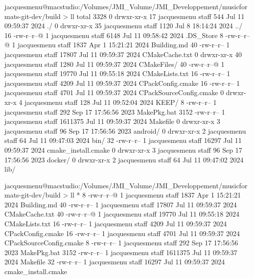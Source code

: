 jacquesmenu@macstudio:/Volumes/JMI_Volume/JMI_Developpement/musicformats-git-dev/build > ll
total 3328
   0 drwxr-xr-x  17 jacquesmenu  staff      544 Jul 11 09:59:37 2024 ./
   0 drwxr-xr-x  35 jacquesmenu  staff     1120 Jul  8 18:14:24 2024 ../
  16 -rw-r--r--@  1 jacquesmenu  staff     6148 Jul 11 09:58:42 2024 .DS_Store
   8 -rw-r--r--@  1 jacquesmenu  staff     1837 Apr  1 15:21:21 2024 Building.md
  40 -rw-r--r--   1 jacquesmenu  staff    17807 Jul 11 09:59:37 2024 CMakeCache.txt
   0 drwxr-xr-x  40 jacquesmenu  staff     1280 Jul 11 09:59:37 2024 CMakeFiles/
  40 -rw-r--r--@  1 jacquesmenu  staff    19770 Jul 11 09:55:18 2024 CMakeLists.txt
  16 -rw-r--r--   1 jacquesmenu  staff     4209 Jul 11 09:59:37 2024 CPackConfig.cmake
  16 -rw-r--r--   1 jacquesmenu  staff     4701 Jul 11 09:59:37 2024 CPackSourceConfig.cmake
   0 drwxr-xr-x   4 jacquesmenu  staff      128 Jul 11 09:52:04 2024 KEEP/
   8 -rw-r--r--   1 jacquesmenu  staff      292 Sep 17 17:56:56 2023 MakePkg.bat
3152 -rw-r--r--   1 jacquesmenu  staff  1611375 Jul 11 09:59:37 2024 Makefile
   0 drwxr-xr-x   3 jacquesmenu  staff       96 Sep 17 17:56:56 2023 android/
   0 drwxr-xr-x   2 jacquesmenu  staff       64 Jul 11 09:47:03 2024 bin/
  32 -rw-r--r--   1 jacquesmenu  staff    16297 Jul 11 09:59:37 2024 cmake_install.cmake
   0 drwxr-xr-x   3 jacquesmenu  staff       96 Sep 17 17:56:56 2023 docker/
   0 drwxr-xr-x   2 jacquesmenu  staff       64 Jul 11 09:47:02 2024 lib/






jacquesmenu@macstudio:/Volumes/JMI_Volume/JMI_Developpement/musicformats-git-dev/build > ll *
   8 -rw-r--r--@ 1 jacquesmenu  staff     1837 Apr  1 15:21:21 2024 Building.md
  40 -rw-r--r--  1 jacquesmenu  staff    17807 Jul 11 09:59:37 2024 CMakeCache.txt
  40 -rw-r--r--@ 1 jacquesmenu  staff    19770 Jul 11 09:55:18 2024 CMakeLists.txt
  16 -rw-r--r--  1 jacquesmenu  staff     4209 Jul 11 09:59:37 2024 CPackConfig.cmake
  16 -rw-r--r--  1 jacquesmenu  staff     4701 Jul 11 09:59:37 2024 CPackSourceConfig.cmake
   8 -rw-r--r--  1 jacquesmenu  staff      292 Sep 17 17:56:56 2023 MakePkg.bat
3152 -rw-r--r--  1 jacquesmenu  staff  1611375 Jul 11 09:59:37 2024 Makefile
  32 -rw-r--r--  1 jacquesmenu  staff    16297 Jul 11 09:59:37 2024 cmake_install.cmake

